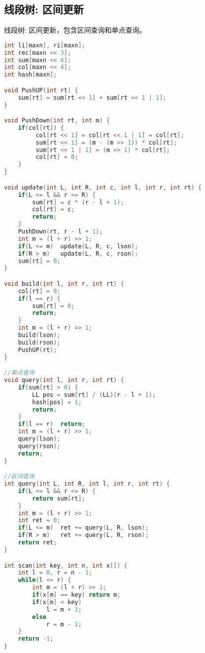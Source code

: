 \subsection{线段树: 区间更新}
    线段树: 区间更新，包含区间查询和单点查询。
    \begin{lstlisting}[language=c++]
int li[maxn], ri[maxn];
int rec[maxn << 3];
int sum[maxn << 4];
int col[maxn << 4];
int hash[maxn];

void PushUP(int rt) {
    sum[rt] = sum[rt << 1] + sum[rt << 1 | 1];
}

void PushDown(int rt, int m) {
    if(col[rt]) {
         col[rt << 1] = col[rt << 1 | 1] = col[rt];
         sum[rt << 1] = (m - (m >> 1)) * col[rt];
         sum[rt << 1 | 1] = (m >> 1) * col[rt];
         col[rt] = 0;
    }
}

void update(int L, int R, int c, int l, int r, int rt) {
    if(L <= l && r <= R) {
        sum[rt] = c * (r - l + 1);
        col[rt] = c;
        return;
    }
    PushDown(rt, r - l + 1);
    int m = (l + r) >> 1;
    if(L <= m)  update(L, R, c, lson);
    if(R > m)   update(L, R, c, rson);
    sum[rt] = 0;
}

void build(int l, int r, int rt) {
    col[rt] = 0;
    if(l == r) {
        sum[rt] = 0;
        return;
    }
    int m = (l + r) >> 1;
    build(lson);
    build(rson);
    PushUP(rt);
}

//单点查询
void query(int l, int r, int rt) { 
    if(sum[rt] > 0) {
        LL pos = sum[rt] / (LL)(r - l + 1);
        hash[pos] = 1;
        return;
    }
    if(l == r)  return;
    int m = (l + r) >> 1;
    query(lson);
    query(rson);
    return;
}

//区间查询
int query(int L, int R, int l, int r, int rt) {
    if(L <= l && r <= R) {
        return sum[rt];
    }
    int m = (l + r) >> 1;
    int ret = 0;
    if(L <= m)  ret += query(L, R, lson);
    if(R > m)   ret += query(L, R, rson);
    return ret;
}

int scan(int key, int n, int x[]) {
    int l = 0, r = n - 1;
    while(l <= r) {
        int m = (l + r) >> 1;
        if(x[m] == key) return m;
        if(x[m] < key)
            l = m + 1;
        else
            r = m - 1;
    }
    return -1;
}


\end{lstlisting}
